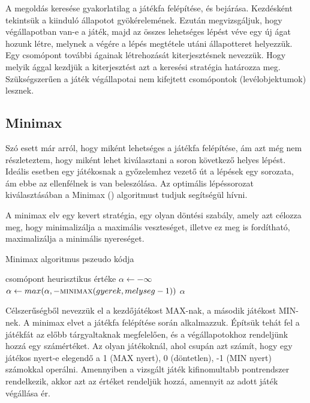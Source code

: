 A megoldás keresése gyakorlatilag a játékfa felépítése, és bejárása. Kezdésként tekintsük a kiinduló állapotot gyökérelemének. Ezután  megvizsgáljuk, hogy végállapotban van-e a játék, majd az összes lehetséges lépést véve egy új ágat hozunk létre, melynek a végére a lépés megtétele utáni állapotteret helyezzük. Egy csomópont további ágainak létrehozását kiterjesztésnek nevezzük. Hogy melyik ággal kezdjük a kiterjesztést azt a keresési stratégia határozza meg. Szükségszerűen a játék végállapotai nem kifejtett csomópontok (levélobjektumok) lesznek.\ujsor

\subsection{Minimax}
Szó esett már arról, hogy miként lehetséges a játékfa felépítése, ám azt még nem részleteztem, hogy miként lehet kiválasztani a soron következő helyes lépést. Ideális esetben egy játékosnak a győzelemhez vezető út a lépések egy sorozata, ám ebbe az ellenfélnek is van beleszólása. Az optimális lépéssorozat kiválasztásában a Minimax () algoritmust tudjuk segítségül hívni.\ujsor

A minimax elv egy kevert stratégia, egy olyan döntési szabály, amely azt célozza meg, hogy minimalizálja a maximális veszteséget, illetve ez meg is fordítható, maximalizálja a minimális nyereséget. \ujsor

\begin{algorithm}
	\caption{Minimax algoritmus pszeudo kódja}
	\label{alg:minimax}
\begin{algorithmic}[1]
		\State \Return csomópont heurisztikus értéke
	\Else
		\State $\alpha \gets -\infty$
			\State $\alpha \gets max(\alpha, -\Call{minimax}{gyerek, melyseg - 1})$
			\State \Return $\alpha$
		\EndFor
	\EndIf
	\EndFunction
\end{algorithmic}
\end{algorithm}

Célszerűségből nevezzük el a kezdőjátékost MAX-nak, a második játékost MIN-nek. A minimax elvet a játékfa felépítése során alkalmazzuk. Építsük tehát fel a játékfát az előbb tárgyaltaknak megfelelően, és a végállapotokhoz rendeljünk hozzá egy számértéket. Az olyan játékoknál, ahol csupán azt számít, hogy egy játékos nyert-e elegendő a 1 (MAX nyert), 0 (döntetlen), -1 (MIN nyert) számokkal operálni. Amennyiben a vizsgált játék kifinomultabb pontrendszer rendelkezik, akkor azt az értéket rendeljük hozzá, amennyit az adott játék végállása ér.\ujsor

